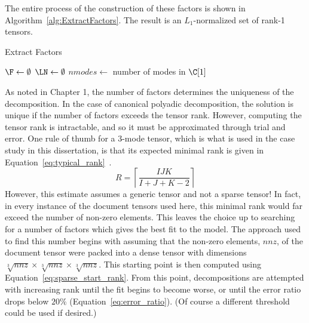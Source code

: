 \documentclass[../ut-dissertation.tex]{subfiles}
\begin{document}
The entire process of the construction of these factors is shown in
Algorithm~\ref{alg:ExtractFactors}.  The result is an $L_1$-normalized
set of rank-1 tensors.

\begin{algorithm}[p]
  \caption{Extract Factors}
  \label{alg:ExtractFactors}
    
   
  \Output{\LN, \F}
  \BlankLine
  $\F \leftarrow \emptyset$\;
  $\LN \leftarrow \emptyset$\;
  $nmodes \leftarrow$ number of modes in $\C[1]$\;
  \Return{\LN, \F}
\end{algorithm}

As noted in Chapter 1, the number of factors determines the uniqueness
of the decomposition.  In the case of canonical polyadic
decomposition, the solution is unique if the number of factors exceeds
the tensor rank.  However, computing the tensor rank is intractable,
and so it must be approximated through trial and error.  One rule of
thumb for a 3-mode tensor, which is what is used in the case study in
this dissertation, is that its expected minimal rank is given in
Equation~\ref{eq:typical_rank}~\cite{comon2009}.
\begin{equation} \label{eq:typical_rank}
  R = \left\lceil \displaystyle\frac{IJK}{I+J+K-2} \right\rceil
\end{equation}
However, this estimate assumes a generic tensor and not a sparse
tensor!  In fact, in every instance of the document tensors used here,
this minimal rank would far exceed the number of non-zero elements.
This leaves the choice up to searching for a number of factors which
gives the best fit to the model.  The approach used to find this
number begins with assuming that the non-zero elements, $nnz$, of the
document tensor were packed into a dense tensor with dimensions
$\sqrt[3]{nnz} \times \sqrt[3]{nnz} \times \sqrt[3]{nnz}$.  This
starting point is then computed using
Equation~\ref{eq:sparse_start_rank}.  From this point, decompositions
are attempted with increasing rank until the fit begins to become
worse, or until the error ratio drops below $20\%$
(Equation~\ref{eq:error_ratio}).  (Of course a different threshold
could be used if desired.)
\end{document}
